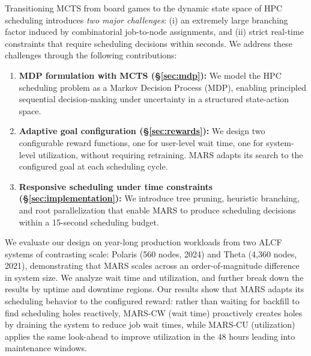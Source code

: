 \documentclass[conference]{IEEEtran}
\begin{document}
Transitioning MCTS from board games to the dynamic state space of HPC scheduling introduces \emph{two major challenges}: (i) an extremely large branching factor induced by combinatorial job-to-node assignments, and (ii) strict real-time constraints that require scheduling decisions within seconds. We address these challenges through the following contributions:
\begin{enumerate}
    \item \textbf{MDP formulation with MCTS (\S\ref{sec:mdp}):} 
    We model the HPC scheduling problem as a Markov Decision Process (MDP), enabling principled sequential decision-making under uncertainty in a structured state-action space.

    \item \textbf{Adaptive goal configuration (\S\ref{sec:rewards}):} 
    We design two configurable reward functions, one for user-level wait time, one for system-level utilization, without requiring retraining.  MARS adapts its search to the configured goal at each scheduling cycle.

    \item \textbf{Responsive scheduling under time constraints (\S\ref{sec:implementation}):} 
    We introduce tree pruning, heuristic branching, and root parallelization that enable MARS to produce scheduling decisions within a 15-second scheduling budget.
\end{enumerate}

We evaluate our design on year-long production workloads from two ALCF systems of contrasting scale: Polaris (560 nodes, 2024) and Theta (4{,}360 nodes, 2021), demonstrating that MARS scales across an order-of-magnitude difference in system size. We analyze wait time and utilization, and further break down the results by uptime and downtime regions. Our results show that MARS adapts its scheduling behavior to the configured reward: rather than waiting for backfill to find scheduling holes reactively, MARS-CW (wait time) proactively creates holes by draining the system to reduce job wait times, while MARS-CU (utilization) applies the same look-ahead to improve utilization in the 48 hours leading into maintenance windows.
\end{document}
